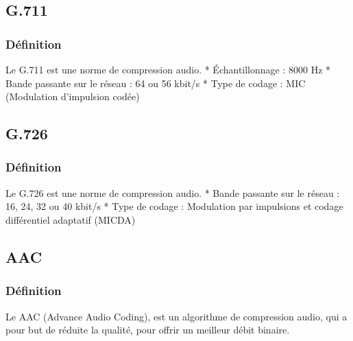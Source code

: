 		\subsection{G.711}
			\subsubsection{Définition}
			Le G.711 est une norme de compression audio.
				* Échantillonnage : 8000 Hz 
				* Bande passante sur le réseau : 64 ou 56 kbit/s
				* Type de codage : MIC (Modulation d'impulsion codée)
		\subsection{G.726}
			\subsubsection{Définition}
			Le G.726 est une norme de compression audio.
				* Bande passante sur le réseau : 16, 24, 32 ou 40 kbit/s
				* Type de codage : Modulation par impulsions et codage différentiel adaptatif (MICDA)
		\subsection{AAC}
			\subsubsection{Définition}
			Le AAC (Advance Audio Coding), est un algorithme de compression audio, qui a
			pour but de réduite la qualité, pour offrir un meilleur débit binaire.
